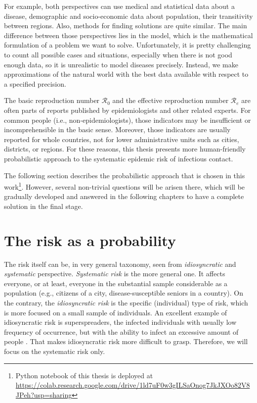 \documentclass[
  digital, %
  oneside, %
  lof,     %
  lot,     %
]{fithesis4}
\begin{document}
For example, both perspectives can use medical and statistical data about a disease, demographic and socio-economic data about population, their transitivity between regions. 
Also, methods for finding solutions are quite similar. 
The main difference between those perspectives lies in the model, which is the mathematical formulation of a problem we want to solve. 
Unfortunately, it is pretty challenging to count all possible cases and situations, especially when there is not good enough data, so it is unrealistic to model diseases precisely. 
Instead, we make approximations of the natural world with the best data available with respect to a specified precision.

The basic reproduction number $\mathcal{R}_0$ and the effective reproduction number $\mathcal{R}_e$ are often parts of reports published by epidemiologists and other related experts.
For common people (i.e., non-epidemiologists), those indicators may be insufficient or incomprehensible in the basic sense.
Moreover, those indicators are usually reported for whole countries, not for lower administrative units such as cities, districts, or regions. 
For these reasons, this thesis presents more human-friendly probabilistic approach to the systematic epidemic risk of infectious contact.

The following section describes the probabilistic approach that is chosen in this work\footnote{Python notebook of this thesis is deployed at \url{https://colab.research.google.com/drive/1ld7uF0w3gILSaOnog7JkJXOo82V8JPeh?usp=sharing}}. 
However, several non-trivial questions will be arisen there, which will be gradually developed and answered in the following chapters to have a complete solution in the final stage.



\chapter{The risk as a probability}
\label{chap:risk-as-probability}

The risk itself can be, in very general taxonomy, seen from \textit{idiosyncratic} and \textit{systematic} perspective.
\textit{Systematic risk} is the more general one. It affects everyone, or at least, everyone in the substantial sample considerable as a population (e.g., citizens of a city, disease-susceptible seniors in a country).
On the contrary, the \textit{idiosyncratic risk} is the specific (individual) type of risk, which is more focused on a small sample of individuals.
An excellent example of idiosyncratic risk is superspreaders, the infected individuals with usually low frequency of occurrence, but with the ability to infect an excessive amount of people \cite[Chapter~4]{brauer2008}.
That makes idiosyncratic risk more difficult to grasp.
Therefore, we will focus on the systematic risk only.
\end{document}
